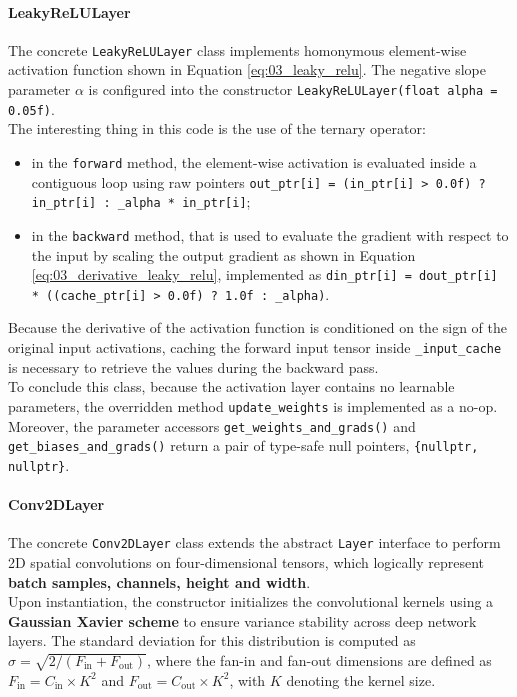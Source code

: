 \paragraph{LeakyReLULayer}

The concrete \texttt{LeakyReLULayer} class implements homonymous element-wise activation function shown in Equation \eqref{eq:03_leaky_relu}. The negative slope parameter $\alpha$ is configured into the constructor \texttt{LeakyReLULayer(float alpha = 0.05f)}.\\

The interesting thing in this code is the use of the ternary operator:
\begin{itemize}
    \item[-] in the \texttt{forward} method, the element-wise activation is evaluated inside a contiguous loop using raw pointers \texttt{out\_ptr[i] = (in\_ptr[i] > 0.0f) ? in\_ptr[i] : \_alpha * in\_ptr[i]};
    \item[-] in the \texttt{backward} method, that is used to evaluate the gradient with respect to the input by scaling the output gradient as shown in Equation \eqref{eq:03_derivative_leaky_relu}, implemented as \texttt{din\_ptr[i] = dout\_ptr[i] * ((cache\_ptr[i] > 0.0f) ? 1.0f : \_alpha)}.
\end{itemize}
Because the derivative of the activation function is conditioned on the sign of the original input activations, caching the forward input tensor inside \texttt{\_input\_cache} is necessary to retrieve the values during the backward pass.\\

To conclude this class, because the activation layer contains no learnable parameters, the overridden method \texttt{update\_weights} is implemented as a no-op. Moreover, the parameter accessors \texttt{get\_weights\_and\_grads()} and \texttt{get\_biases\_and\_grads()} return a pair of type-safe null pointers, \texttt{\{nullptr, nullptr\}}.

\paragraph{Conv2DLayer}
\label{sec:03_conv}

The concrete \texttt{Conv2DLayer} class extends the abstract \texttt{Layer} interface to perform 2D spatial convolutions on four-dimensional tensors, which logically represent \textbf{batch samples, channels, height and width}.\\

Upon instantiation, the constructor initializes the convolutional kernels using a \textbf{Gaussian Xavier scheme} to ensure variance stability across deep network layers. The standard deviation for this distribution is computed as $\sigma = \sqrt{2 / (F_{\text{in}} + F_{\text{out}})}$, where the fan-in and fan-out dimensions are defined as $F_{\text{in}} = C_{\text{in}} \times K^2$ and $F_{\text{out}} = C_{\text{out}} \times K^2$, with $K$ denoting the kernel size.\\

